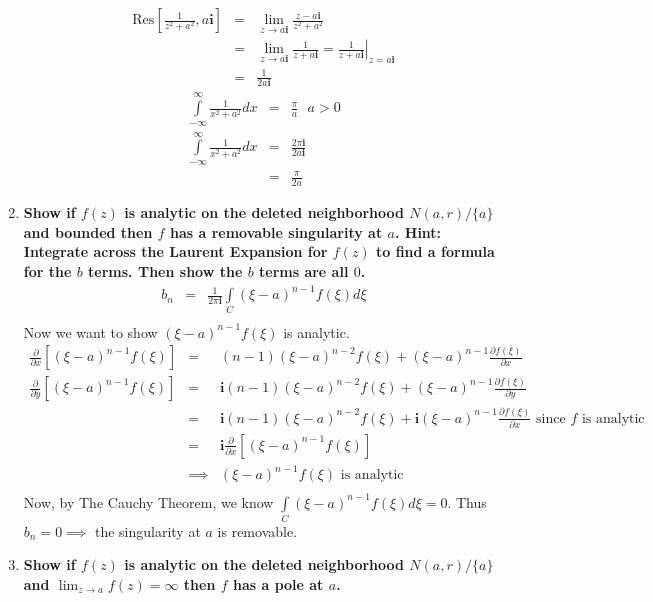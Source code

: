 \documentclass{article}%
\newcommand\Res[1]{\text{Res}{#1}}
\newcommand\I{\textbf{i}}
\begin{document}
\begin{enumerate}
    \begin{eqnarray*}
        \Res{\left[\frac{1}{z^2+a^2},a\I\right]} &=& \lim_{z\to a\I}\frac{z-a\I}{z^2+a^2} \\
            &=& \lim_{z\to a\I}\frac{1}{z+a\I} = \left.\frac{1}{z+a\I}\right|_{z=a\I} \\
            &=& \frac{1}{2a\I}
    \end{eqnarray*}
    \begin{eqnarray*}
        \int\limits_{-\infty}^{\infty}{\frac{1}{x^2+a^2}dx} &=& \frac{\pi}{a}~~~a>0 \\
        \int\limits_{-\infty}^{\infty}{\frac{1}{x^2+a^2}dx} &=& \frac{2\pi\I}{2a\I} \\
            &=& \frac{\pi}{2a}
    \end{eqnarray*}
    \item %
    \textbf{Show if $f(z)$ is analytic on the deleted neighborhood $N(a,r)/\{a\}$ and bounded then $f$ has a removable singularity at $a$.
            Hint: Integrate across the Laurent Expansion for $f(z)$ to find a formula for the $b$ terms. Then show the $b$ terms are all $0$.} \\
    \begin{eqnarray*}
        b_n &=& \frac{1}{2\pi\I}\int\limits_{C}{(\xi-a)^{n-1}f(\xi)d\xi} \\
    \end{eqnarray*}
    Now we want to show $(\xi-a)^{n-1}f(\xi)$ is analytic.
    \begin{eqnarray*}
        \frac{\partial}{\partial x}\left[(\xi-a)^{n-1}f(\xi) \right] &=& (n-1)(\xi-a)^{n-2}f(\xi) + (\xi-a)^{n-1} \frac{\partial f(\xi)}{\partial x} \\
        \frac{\partial}{\partial y}\left[(\xi-a)^{n-1}f(\xi) \right] &=& \I(n-1)(\xi-a)^{n-2}f(\xi) + (\xi-a)^{n-1} \frac{\partial f(\xi)}{\partial y} \\
        &=&  \I(n-1)(\xi-a)^{n-2}f(\xi) + \I (\xi-a)^{n-1} \frac{\partial f(\xi)}{\partial x} \text{ since $f$ is analytic} \\
        &=& \I \frac{\partial}{\partial x}\left[(\xi-a)^{n-1}f(\xi) \right]\\
        &\implies& (\xi-a)^{n-1} f(\xi) \text{ is analytic} \\
    \end{eqnarray*}
    Now, by The Cauchy Theorem, we know $\int\limits_{C}{(\xi-a)^{n-1}f(\xi)d\xi} = 0$. Thus $b_n = 0 \implies$ the singularity at $a$ is removable.
    \item %
    \textbf{Show if $f(z)$ is analytic on the deleted neighborhood $N(a,r)/\{a\}$ and $\lim_{z\to a}f(z)=\infty$ then $f$ has a pole at $a$.
}
\end{enumerate}
\end{document}
